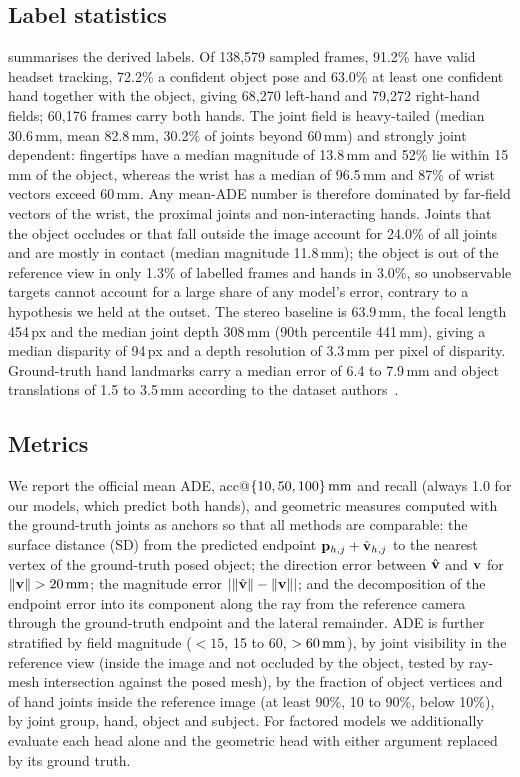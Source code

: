 \subsection{Label statistics}
 summarises the derived labels. Of 138,579 sampled frames, 91.2\% have valid headset tracking, 72.2\% a confident object pose and 63.0\% at least one confident hand together with the object, giving 68,270 left-hand and 79,272 right-hand fields; 60,176 frames carry both hands. The joint field is heavy-tailed (median 30.6\,mm, mean 82.8\,mm, 30.2\% of joints beyond 60\,mm) and strongly joint dependent: fingertips have a median magnitude of 13.8\,mm and 52\% lie within 15\,mm of the object, whereas the wrist has a median of 96.5\,mm and 87\% of wrist vectors exceed 60\,mm. Any mean-ADE number is therefore dominated by far-field vectors of the wrist, the proximal joints and non-interacting hands. Joints that the object occludes or that fall outside the image account for 24.0\% of all joints and are mostly in contact (median magnitude 11.8\,mm); the object is out of the reference view in only 1.3\% of labelled frames and hands in 3.0\%, so unobservable targets cannot account for a large share of any model's error, contrary to a hypothesis we held at the outset. The stereo baseline is 63.9\,mm, the focal length 454\,px and the median joint depth 308\,mm (90th percentile 441\,mm), giving a median disparity of 94\,px and a depth resolution of 3.3\,mm per pixel of disparity. Ground-truth hand landmarks carry a median error of 6.4 to 7.9\,mm and object translations of 1.5 to 3.5\,mm according to the dataset authors~\cite{rim2026show3d}.

\subsection{Metrics}
We report the official mean ADE, acc@$\{10,50,100\}\,\mathrm{mm}$ and recall (always 1.0 for our models, which predict both hands), and geometric measures computed with the ground-truth joints as anchors so that all methods are comparable: the surface distance (SD) from the predicted endpoint $\mathbf{p}_{h,j}+\hat{\mathbf{v}}_{h,j}$ to the nearest vertex of the ground-truth posed object; the direction error between $\hat{\mathbf{v}}$ and $\mathbf{v}$ for $\|\field\|>20\mm$; the magnitude error $|\|\hat{\mathbf{v}}\|-\|\mathbf{v}\||$; and the decomposition of the endpoint error into its component along the ray from the reference camera through the ground-truth endpoint and the lateral remainder. ADE is further stratified by field magnitude ($<15$, 15 to 60, $>60\,\mathrm{mm}$), by joint visibility in the reference view (inside the image and not occluded by the object, tested by ray-mesh intersection against the posed mesh), by the fraction of object vertices and of hand joints inside the reference image (at least 90\%, 10 to 90\%, below 10\%), by joint group, hand, object and subject. For factored models we additionally evaluate each head alone and the geometric head with either argument replaced by its ground truth.

